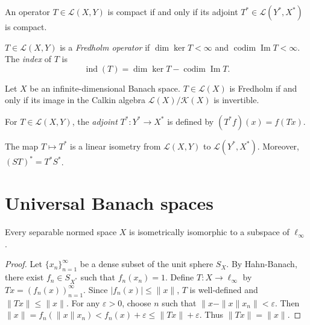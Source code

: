\begin{theorem}[Schauder]
\label{theorem-schauder-compact-adjoint}
An operator $T \in \mathcal L(X,Y)$ is
compact if and only if its adjoint $T^* \in
\mathcal L(Y^*, X^*)$ is compact.
\end{theorem}

\begin{definition}
\label{definition-fredholm-operator}
$T \in \mathcal L(X,Y)$ is a {\it Fredholm
operator} if $\dim \ker T < \infty$ and
$\operatorname{codim} \operatorname{Im} T <
\infty$. The {\it index} of $T$ is
$$
\operatorname{ind}(T) = \dim \ker T -
\operatorname{codim} \operatorname{Im} T.
$$
\end{definition}

\begin{theorem}[Atkinson]
\label{theorem-atkinson}
Let $X$ be an infinite-dimensional Banach
space. $T \in \mathcal L(X)$ is Fredholm if
and only if its image in the Calkin algebra
$\mathcal L(X) / \mathcal K(X)$ is
invertible.
\end{theorem}

\begin{definition}
\label{definition-adjoint-banach}
For $T \in \mathcal L(X,Y)$, the {\it
adjoint} $T^* : Y^* \to X^*$ is defined by
$(T^*f)(x) = f(Tx)$.
\end{definition}

\begin{proposition}
\label{proposition-adjoint-properties}
The map $T \mapsto T^*$ is a linear isometry
from $\mathcal L(X,Y)$ to $\mathcal L(Y^*,
X^*)$. Moreover, $(ST)^* = T^*S^*$.
\end{proposition}


\section{Universal Banach spaces}
\label{section-universal-banach-spaces}

\begin{theorem}
\label{theorem-separable-embeds-linfty}
Every separable normed space $X$ is
isometrically isomorphic to a subspace of
$\ell_\infty$.
\end{theorem}

\begin{proof}
Let $\{x_n\}_{n=1}^\infty$ be a dense subset
of the unit sphere $S_X$. By Hahn-Banach,
there exist $f_n \in S_{X^*}$ such that
$f_n(x_n) = 1$. Define $T : X \to
\ell_\infty$ by $Tx = (f_n(x))_{n=1}^\infty$.
Since $|f_n(x)| \leq \|x\|$, $T$ is
well-defined and $\|Tx\| \leq \|x\|$. For any
$\varepsilon > 0$, choose $n$ such that $\|x
- \|x\|x_n\| < \varepsilon$. Then $\|x\| =
f_n(\|x\|x_n) < f_n(x) + \varepsilon \leq
\|Tx\| + \varepsilon$. Thus $\|Tx\| = \|x\|$.
\end{proof}

